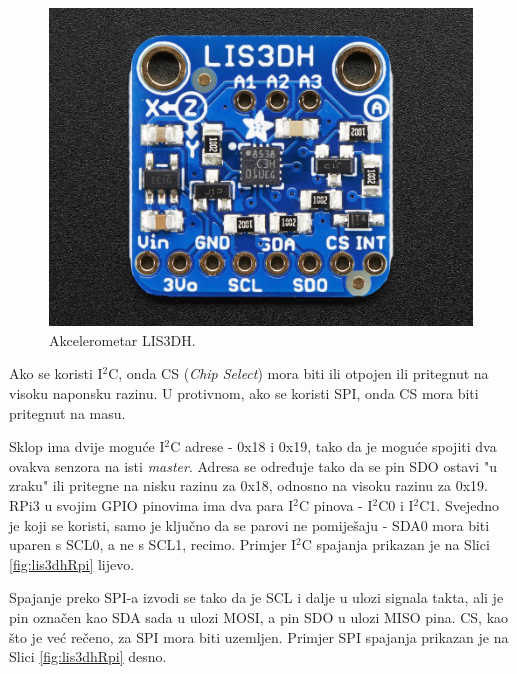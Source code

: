 \documentclass[12pt,a4paper]{article}
\begin{document}
		\begin{figure}[h!]
			\includegraphics[width=\linewidth]{slike/lis3dh.jpg}
			\caption{Akcelerometar LIS3DH.}
			\label{fig:lis3dh}
		\end{figure}

		\par Ako se koristi I$^2$C, onda CS (\textit{Chip Select}) mora biti ili otpojen ili pritegnut na visoku naponsku razinu. U protivnom, ako se koristi SPI, onda CS mora biti pritegnut na masu.

		\par Sklop ima dvije moguće I$^2$C adrese - 0x18 i 0x19, tako da je moguće spojiti dva ovakva senzora na isti \textit{master}. Adresa se određuje tako da se pin SDO ostavi "u zraku" ili pritegne na nisku razinu za 0x18, odnosno na visoku razinu za 0x19. \\
		RPi3 u svojim GPIO pinovima ima dva para I$^2$C pinova - I$^2$C0 i I$^2$C1. Svejedno je koji se koristi, samo je ključno da se parovi ne pomiješaju - SDA0 mora biti uparen s SCL0, a ne s SCL1, recimo. Primjer I$^2$C spajanja prikazan je na Slici \ref{fig:lis3dhRpi} lijevo.

		\par Spajanje preko SPI-a izvodi se tako da je SCL i dalje u ulozi signala takta, ali je pin označen kao SDA sada u ulozi MOSI, a pin SDO u ulozi MISO pina. CS, kao što je već rečeno, za SPI mora biti uzemljen. Primjer SPI spajanja prikazan je na Slici \ref{fig:lis3dhRpi} desno.
\end{document}
